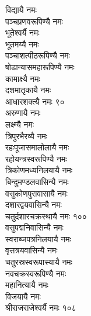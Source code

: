 \begin{multicols}{2}
विद्यायै नमः\\
पञ्चप्रणवरूपिण्यै नमः\\
भूतेश्वर्यै नमः\\
भूतमय्यै नमः\\
पञ्चाशत्पीठरूपिण्यै नमः\\
षोडान्यास\-महा\-रूपि\-ण्यै नमः\\
कामाक्ष्यै नमः\\
दशमातृकायै नमः\\
आधारशक्त्यै नमः \hfill ९०\\
अरुणायै नमः\\
लक्ष्म्यै नमः\\
त्रिपुरभैरव्यै नमः\\
रहःपूजासमालोलायै नमः\\
रहोयन्त्रस्वरूपिण्यै नमः\\
त्रिकोणमध्यनिलयायै नमः\\
बिन्दुमण्डल\-वासि\-न्यै नमः\\
वसुकोणपुरा\-वासायै नमः\\
दशारद्वयवासिन्यै नमः\\
चतुर्दशारचक्रस्थायै नमः \hfill १००\\
वसुपद्मनिवासिन्यै नमः\\
स्वराब्जपत्रनिलयायै नमः\\
वृत्तत्रयवासिन्यै नमः\\
चतुरस्रस्वरूपास्यायै नमः\\
नवचक्रस्वरूपिण्यै नमः\\
महानित्यायै नमः\\
विजयायै नमः\\
श्रीराजराजेश्वर्यै नमः \hfill १०८\\
\end{multicols}
